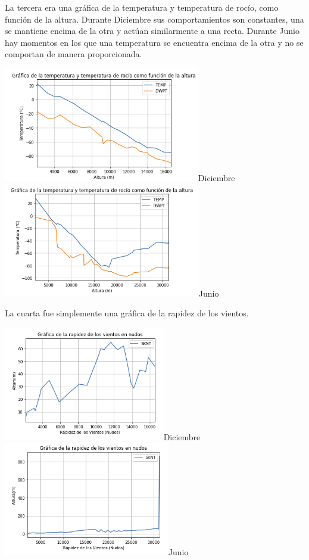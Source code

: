 \documentclass{article}
\begin{document}
    La tercera era una gráfica de la temperatura y temperatura de rocío, como función de la altura. Durante Diciembre sus comportamientos son constantes, una se mantiene encima de la otra y actúan similarmente a una recta. Durante Junio hay momentos en los que una temperatura se encuentra encima de la otra y no se comportan de manera proporcionada.
    
    \begin{center}
    \includegraphics[height=5cm]{DobleDec1.png}{Diciembre}
    \includegraphics[height=5cm]{DobleJun1.png}{Junio}
    \end{center}
    
    La cuarta fue simplemente una gráfica de la rapidez de los vientos. 
    
    \begin{center}
    \includegraphics[height=5cm]{VienDec.png}{Diciembre}
    \includegraphics[height=5cm]{VienJun.png}{Junio}
    \end{center}
    
\end{document}
